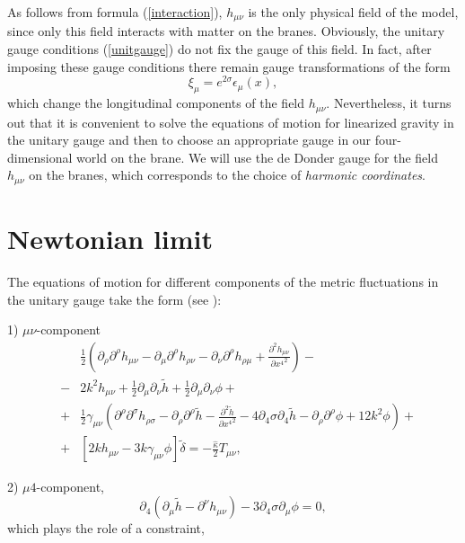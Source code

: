 \documentclass[a4paper,12pt]{article}
\begin{document}
As follows from formula (\ref{interaction}), $h_{\mu\nu}$ is the only
physical field of the model, since only this field interacts with  matter
on the branes. Obviously, the unitary gauge conditions (\ref{unitgauge}) do
not fix the gauge of this field. In fact, after imposing these gauge
conditions there remain gauge transformations of the form
\begin{equation}\label{remgaugetr}
   \xi_\mu = e^{2\sigma}\epsilon_\mu(x),
\end{equation}
which change the longitudinal components of the field $h_{\mu\nu}$.
Nevertheless, it turns out that it is convenient to  solve the equations of
motion for linearized gravity in the unitary gauge and then to  choose an
appropriate gauge  in our four-dimensional world on the brane. We will use
the de Donder gauge for the field $h_{\mu\nu}$  on the branes, which
corresponds  to the choice of  {\it harmonic coordinates}.

\section{Newtonian limit}
The equations of motion  for different components of the metric
fluctuations in the unitary gauge take the form (see \cite{BKSV}):

 1) $\mu\nu$-component
\begin{eqnarray}\label{mu-nu}
 & &\frac{1}{2}\left(\partial_\rho \partial^\rho h_{\mu\nu}-
\partial_\mu \partial^\rho
h_{\rho\nu}-\partial_\nu \partial^\rho h_{\rho\mu} +
\frac{\partial^2 h_{\mu\nu}}{\partial {x^4}^2}\right)- \\ \nonumber
&-& 2k^2h_{\mu\nu}+\frac{1}{2}\partial_\mu \partial_\nu\tilde h+
\frac{1}{2}\partial_\mu \partial_\nu \phi+  \\ \nonumber
&+& \frac{1}{2} \gamma_{\mu\nu}\left(\partial^\rho \partial^\sigma
h_{\rho\sigma}-\partial_\rho \partial^\rho \tilde h -
\frac{\partial^2 \tilde h}{\partial {x^4}^2}-4\partial_4 \sigma
\partial_4 \tilde h
 - \partial_\rho \partial^\rho \phi + 12 k^2 \phi\right)+\\ \nonumber
&+& \left[2k  h_{\mu\nu} - 3k\gamma_{\mu\nu}\phi \right]\tilde
\delta = -\frac{\hat \kappa}{2} T_{\mu\nu},
\end{eqnarray}

 2) $\mu 4$-component,
\begin{equation}\label{mu-4}
\partial_4 ( \partial_\mu \tilde h - \partial^\nu  h_{\mu\nu})-
3\partial_4 \sigma \partial_\mu \phi = 0,
\end{equation}
which plays the role of a constraint,
\end{document}
